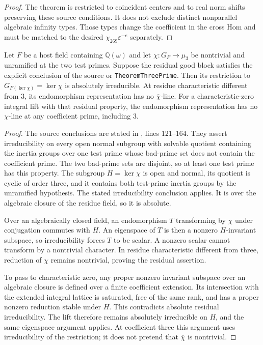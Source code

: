 \begin{proof}
The theorem is restricted to coincident centers and to
real norm shifts preserving these source conditions.
It does not exclude distinct nonparallel algebraic infinity
types.  Those types change the coefficient in the cross
Hom and must be matched to the desired
$\chi_{269}\varepsilon^{-e}$ separately.
\end{proof}

\begin{corollary}
\label{AC-G37-self}
Let $F$ be a host field containing $\mathbb Q(\omega)$ and
let $\chi:G_F\to\mu_3$ be nontrivial and unramified at the
two test primes.  Suppose the residual good block satisfies
the explicit conclusion of the source
 or
\texttt{TheoremThreePrime}.  Then its restriction to
$G_{F(\ker\chi)}=\ker\chi$ is absolutely irreducible.
At residue characteristic different from $3$, its endomorphism
representation has no $\overline\chi$-line.
For a characteristic-zero integral lift with that residual
property, the endomorphism representation has no $\chi$-line
at any coefficient prime, including $3$.
\end{corollary}
\begin{proof}
The source conclusions are stated in
, lines 121--164.
They assert irreducibility on every open normal subgroup
with solvable quotient containing the inertia groups over
one test prime whose bad-prime set does not contain the
coefficient prime.  The two bad-prime sets are disjoint,
so at least one test prime has this property.
The subgroup $H=\ker\chi$ is open and normal, its quotient
is cyclic of order three, and it contains both test-prime
inertia groups by the unramified hypothesis.  The stated
irreducibility conclusion applies.  It is over the algebraic
closure of the residue field, so it is absolute.

Over an algebraically closed field, an endomorphism $T$
transforming by $\chi$ under conjugation commutes with $H$.
An eigenspace of $T$ is then a nonzero $H$-invariant subspace,
so irreducibility forces $T$ to be scalar.  A nonzero scalar
cannot transform by a nontrivial character.  In residue
characteristic different from three, reduction of $\chi$
remains nontrivial, proving the residual assertion.

To pass to characteristic zero, any proper nonzero invariant
subspace over an algebraic closure is defined over a finite
coefficient extension.  Its intersection with the extended
integral lattice is saturated, free of the same rank, and
has a proper nonzero reduction stable under $H$.  This
contradicts absolute residual irreducibility.  The lift
therefore remains absolutely irreducible on $H$, and the
same eigenspace argument applies.  At coefficient three
this argument uses irreducibility of the restriction; it
does not pretend that $\overline\chi$ is nontrivial.
\end{proof}

